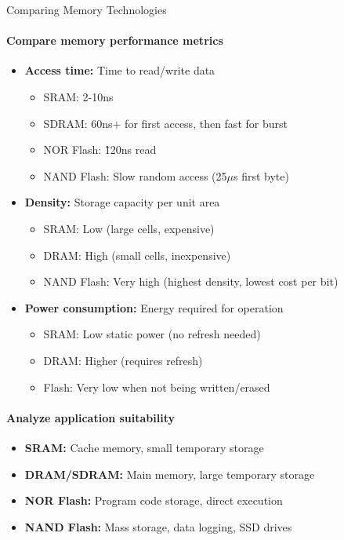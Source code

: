 \begin{KR}{Comparing Memory Technologies}
\paragraph{Compare memory performance metrics}
\begin{itemize}
    \item \textbf{Access time:} Time to read/write data
    \begin{itemize}
        \item SRAM: 2-10ns
        \item SDRAM: 60ns+ for first access, then fast for burst
        \item NOR Flash: \~120ns read
        \item NAND Flash: Slow random access (25$\mu$s first byte)
    \end{itemize}
    \item \textbf{Density:} Storage capacity per unit area
    \begin{itemize}
        \item SRAM: Low (large cells, expensive)
        \item DRAM: High (small cells, inexpensive)
        \item NAND Flash: Very high (highest density, lowest cost per bit)
    \end{itemize}
    \item \textbf{Power consumption:} Energy required for operation
    \begin{itemize}
        \item SRAM: Low static power (no refresh needed)
        \item DRAM: Higher (requires refresh)
        \item Flash: Very low when not being written/erased
    \end{itemize}
\end{itemize}

\paragraph{Analyze application suitability}
\begin{itemize}
    \item \textbf{SRAM:} Cache memory, small temporary storage
    \item \textbf{DRAM/SDRAM:} Main memory, large temporary storage
    \item \textbf{NOR Flash:} Program code storage, direct execution
    \item \textbf{NAND Flash:} Mass storage, data logging, SSD drives
\end{itemize}
\end{KR}

